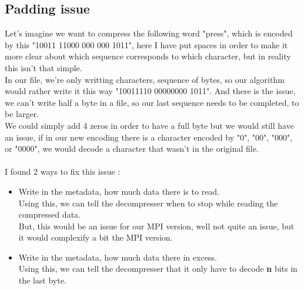 \subsection{Padding issue}
Let's imagine we want to compress the following word "press", which is encoded by this "10011 11000 000 000 1011", here I have put spaces in order to make it more clear about which sequence corresponds to which character, but in reality this isn't that simple.\\
In our file, we're only writting characters, sequence of bytes, so our algorithm would rather write it this way "10011110 00000000 1011". And there is the issue, we can't write half a byte in a file, so our last sequence needs to be completed, to be larger.\\
We could simply add 4 zeros in order to have a full byte but we would still have an issue, if in our new encoding there is a character encoded by "0", "00", "000", or "0000", we would decode a character that wasn't in the original file.\\
\\
I found 2 ways to fix this issue :
\begin{itemize}
\item Write in the metadata, how much data there is to read.\\
Using this, we can tell the decompresser when to stop while reading the compressed data.\\
But, this would be an issue for our MPI version, well not quite an issue, but it would complexify a bit the MPI version.
\item Write in the metadata, how much data there in excess.\\
Using this, we can tell the decompresser that it only have to decode \textbf{n} bits in the last byte.
\end{itemize}